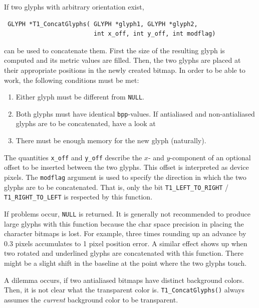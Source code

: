 If two glyphs with arbitrary orientation exist,
\precorr
\begin{verbatim}
 GLYPH *T1_ConcatGlyphs( GLYPH *glyph1, GLYPH *glyph2,
                         int x_off, int y_off, int modflag)
\end{verbatim}\postcorr
can be used to concatenate them. First the size of the resulting glyph is
computed and its metric values are filled. Then, the two glyphs are placed at
their appropriate positions in the newly created bitmap. In order to be able
to work, the following conditions must be met:
\begin{enumerate}
\item Either glyph must be different from \verb+NULL+.
\item Both glyphs must have identical \verb+bpp+-values. If antialiased and
  non-antialiased glyphs are to be concatenated, have a look at
\item There must be enough memory for the new glyph (naturally).
\end{enumerate}
The quantities \verb+x_off+ and \verb+y_off+ describe the $x$- and
$y$-component of an optional offset to be inserted between the two
glyphs. This offset is interpreted as device pixels. The \verb+modflag+
argument is used to specify the direction in which the two glyphs are to be
concatenated. That is, only the bit \verb+T1_LEFT_TO_RIGHT+ /
\verb+T1_RIGHT_TO_LEFT+ is respected by this function.

If problems occur, \verb+NULL+ is returned.
It is generally not recommended to produce large glyphs with this function
because the char space precision in placing the character bitmaps is lost. For
example, three times rounding up an advance by 0.3 pixels accumulates to 1
pixel position error. A similar effect shows up when two rotated and underlined
glyphs are concatenated with this function. There might be a slight shift in the
baseline at the point where the two glyphs touch.

A dilemma occurs, if two antialiased bitmaps have distinct background
colors. Then, it is not clear what the transparent color
is. \verb+T1_ConcatGlyphs()+ always assumes the {\em current} background color
to be transparent.


